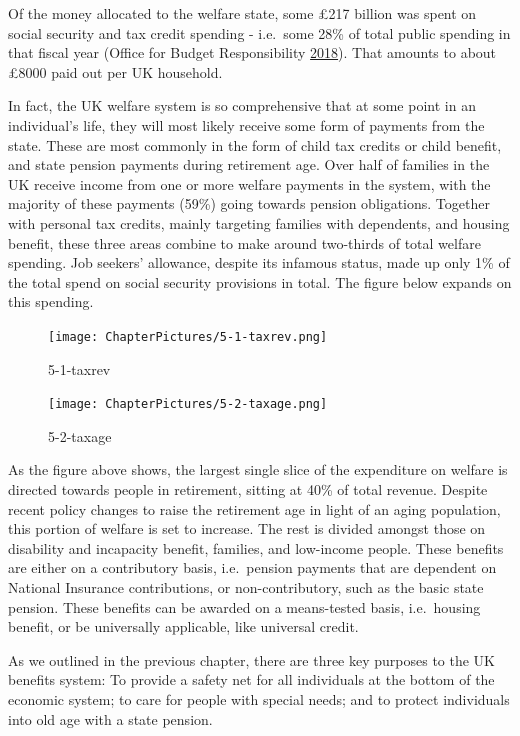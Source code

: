 \documentclass[]{tufte-handout}
\begin{document}
Of the money allocated to the welfare state, some £217 billion was spent
on social security and tax credit spending - i.e.~some 28\% of total
public spending in that fiscal year (Office for Budget Responsibility
\protect\hyperlink{ref-OBR2018}{2018}). That amounts to about £8000 paid
out per UK household.

In fact, the UK welfare system is so comprehensive that at some point in
an individual's life, they will most likely receive some form of
payments from the state. These are most commonly in the form of child
tax credits or child benefit, and state pension payments during
retirement age. Over half of families in the UK receive income from one
or more welfare payments in the system, with the majority of these
payments (59\%) going towards pension obligations. Together with
personal tax credits, mainly targeting families with dependents, and
housing benefit, these three areas combine to make around two-thirds of
total welfare spending. Job seekers' allowance, despite its infamous
status, made up only 1\% of the total spend on social security
provisions in total. The figure below expands on this spending.

\begin{figure}
\centering
\texttt{[image: ChapterPictures/5-1-taxrev.png]}
\caption{5-1-taxrev}
\end{figure}

\begin{figure}
\centering
\texttt{[image: ChapterPictures/5-2-taxage.png]}
\caption{5-2-taxage}
\end{figure}

As the figure above shows, the largest single slice of the expenditure
on welfare is directed towards people in retirement, sitting at 40\% of
total revenue. Despite recent policy changes to raise the retirement age
in light of an aging population, this portion of welfare is set to
increase. The rest is divided amongst those on disability and incapacity
benefit, families, and low-income people. These benefits are either on a
contributory basis, i.e.~pension payments that are dependent on National
Insurance contributions, or non-contributory, such as the basic state
pension. These benefits can be awarded on a means-tested basis,
i.e.~housing benefit, or be universally applicable, like universal
credit.

As we outlined in the previous chapter, there are three key purposes to
the UK benefits system: To provide a safety net for all individuals at
the bottom of the economic system; to care for people with special
needs; and to protect individuals into old age with a state pension.
\end{document}

